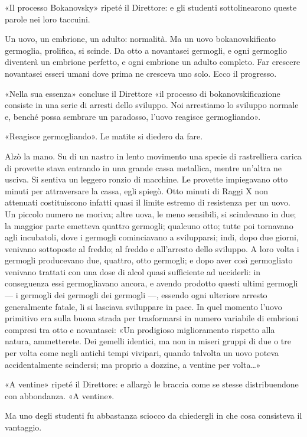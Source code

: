 \documentclass[
a5paper, %
10pt, %
twoside, 
onecolumn, %
openany, %
]{memoir}
\begin{document}
«Il processo Bokanovsky» ripeté il Direttore: e gli studenti sottolinearono queste parole nei loro taccuini.

Un uovo, un embrione, un adulto: normalità. Ma un uovo bokanovskificato germoglia, prolifica, si scinde. Da otto a novantasei germogli, e ogni germoglio diventerà un embrione perfetto, e ogni embrione un adulto completo. Far crescere novantasei esseri umani dove prima ne cresceva uno solo. Ecco il progresso.

«Nella sua essenza» concluse il Direttore «il processo di bokanovskificazione consiste in una serie di arresti dello sviluppo. Noi arrestiamo lo sviluppo normale e, benché possa sembrare un paradosso, l’uovo reagisce germogliando».

«Reagisce germogliando». Le matite si diedero da fare.

Alzò la mano. Su di un nastro in lento movimento una specie di rastrelliera carica di provette stava entrando in una grande cassa metallica, mentre un’altra ne usciva. Si sentiva un leggero ronzio di macchine. Le provette impiegavano otto minuti per attraversare la cassa, egli spiegò. Otto minuti di Raggi X non attenuati costituiscono infatti quasi il limite estremo di resistenza per un uovo. Un piccolo numero ne moriva; altre uova, le meno sensibili, si scindevano in due; la maggior parte emetteva quattro germogli; qualcuno otto; tutte poi tornavano agli incubatoli, dove i germogli cominciavano a svilupparsi; indi, dopo due giorni, venivano sottoposte al freddo; al freddo e all’arresto dello sviluppo. A loro volta i germogli producevano due, quattro, otto germogli; e dopo aver così germogliato venivano trattati con una dose di alcol quasi sufficiente ad ucciderli: in conseguenza essi germogliavano ancora, e avendo prodotto questi ultimi germogli — i germogli dei germogli dei germogli —, essendo ogni ulteriore arresto generalmente fatale, li si lasciava sviluppare in pace. In quel momento l’uovo primitivo era sulla buona strada per trasformarsi in numero variabile di embrioni compresi tra otto e novantasei: «Un prodigioso miglioramento rispetto alla natura, ammetterete. Dei gemelli identici, ma non in miseri gruppi di due o tre per volta come negli antichi tempi vivipari, quando talvolta un uovo poteva accidentalmente scindersi; ma proprio a dozzine, a ventine per volta…»

«A ventine» ripeté il Direttore: e allargò le braccia come se stesse distribuendone con abbondanza. «A ventine».

Ma uno degli studenti fu abbastanza sciocco da chiedergli in che cosa consisteva il vantaggio.
\end{document}
